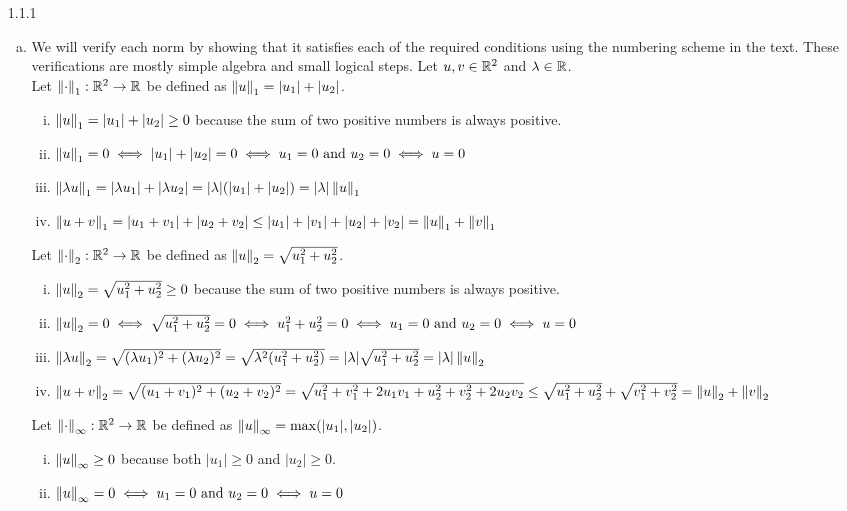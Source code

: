 \documentclass[../../Solutions.tex]{subfiles}
\begin{document}
\begin{itemize}
	\item [1.1.1]
		\begin{enumerate}[(a)]
			\item We will verify each norm by showing that it satisfies each of the required conditions using the numbering scheme in the text. These verifications are mostly simple algebra and small logical steps.
				Let $u,v \in \mathbb{R}^2$ and $\lambda \in \mathbb{R}$. \\
				Let $\left\lVert\cdot\right\rVert_1:\mathbb{R}^2 \to \mathbb{R}$ be defined as $\left\lVert u\right\rVert_1 = |u_1|+|u_2|$.
				\begin{enumerate}[(i)]
					\item $\left\lVert u\right\rVert_1 = |u_1|+|u_2| \geq 0$ because the sum of two positive numbers is always positive.
					\item $\left\lVert u\right\rVert_1 = 0 \iff |u_1|+|u_2| = 0 \iff u_1 = 0 \text{ and } u_2 = 0 \iff u = 0$
					\item $\left\lVert\lambda u\right\rVert_1 = |\lambda u_1|+|\lambda u_2| = |\lambda|(|u_1|+|u_2|) = |\lambda|\left\lVert u\right\rVert_1$
					\item $\left\lVert u+v\right\rVert_1 = |u_1+v_1|+|u_2+v_2| \leq |u_1|+|v_1|+|u_2|+|v_2| = \left\lVert u\right\rVert_1+\left\lVert v\right\rVert_1$
				\end{enumerate}
				Let $\left\lVert\cdot\right\rVert_2:\mathbb{R}^2 \to \mathbb{R}$ be defined as $\left\lVert u\right\rVert_2 = \sqrt{u_1^2+u_2^2}$.
				\begin{enumerate}[(i)]
					\item $\left\lVert u\right\rVert_2 = \sqrt{u_1^2+u_2^2} \geq 0$ because the sum of two positive numbers is always positive.
					\item $\left\lVert u\right\rVert_2 = 0 \iff \sqrt{u_1^2+u_2^2} = 0 \iff u_1^2+u_2^2 = 0 \iff u_1 = 0 \text{ and } u_2 = 0 \iff u = 0$
					\item $\left\lVert\lambda u\right\rVert_2 = \sqrt{(\lambda u_1)^2+(\lambda u_2)^2} = \sqrt{\lambda^2(u_1^2+u_2^2)} = |\lambda|\sqrt{u_1^2+u_2^2} = |\lambda|\left\lVert u\right\rVert_2$
					\item $\left\lVert u+v\right\rVert_2 = \sqrt{(u_1+v_1)^2+(u_2+v_2)^2} = \sqrt{u_1^2+v_1^2+2u_1v_1+u_2^2+v_2^2+2u_2v_2} \leq \sqrt{u_1^2+u_2^2}+\sqrt{v_1^2+v_2^2} = \left\lVert u\right\rVert_2+\left\lVert v\right\rVert_2$
				\end{enumerate}
				Let $\left\lVert\cdot\right\rVert_\infty:\mathbb{R}^2 \to \mathbb{R}$ be defined as $\left\lVert u\right\rVert_\infty = \max(|u_1|,|u_2|)$.
				\begin{enumerate}[(i)]
					\item $\left\lVert u\right\rVert_\infty \geq 0$ because both $|u_1| \geq 0$ and $|u_2| \geq 0$.
					\item $\left\lVert u\right\rVert_\infty = 0 \iff u_1 = 0 \text{ and } u_2 = 0 \iff u = 0$

\end{enumerate}
\end{enumerate}
\end{itemize}
\end{document}
